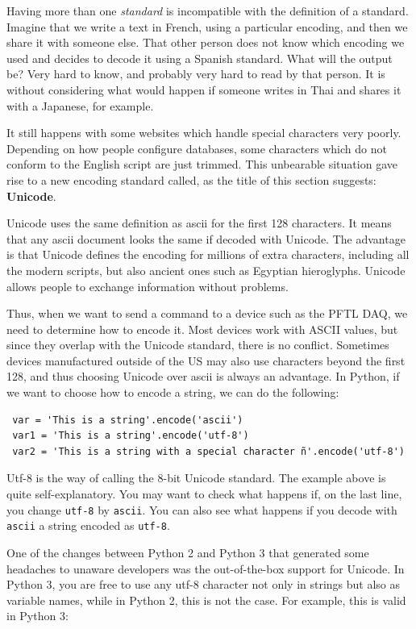 Having more than one \textit{standard} is incompatible with the definition of a standard. Imagine that we write a text in French, using a particular encoding, and then we share it with someone else. That other person does not know which encoding we used and decides to decode it using a Spanish standard. What will the output be? Very hard to know, and probably very hard to read by that person. It is without considering what would happen if someone writes in Thai and shares it with a Japanese, for example.

It still happens with some websites which handle special characters very poorly. Depending on how people configure databases, some characters which do not conform to the English script are just trimmed. This unbearable situation gave rise to a new encoding standard called, as the title of this section suggests: \textbf{Unicode}.

Unicode uses the same definition as ascii for the first 128 characters. It means that any ascii document looks the same if decoded with Unicode. The advantage is that Unicode defines the encoding for millions of extra characters, including all the modern scripts, but also ancient ones such as Egyptian hieroglyphs. Unicode allows people to exchange information without problems.

Thus, when we want to send a command to a device such as the {PFTL DAQ}, we need to determine how to encode it. Most devices work with ASCII values, but since they overlap with the Unicode standard, there is no conflict. Sometimes devices manufactured outside of the US may also use characters beyond the first 128, and thus choosing Unicode over ascii is always an advantage. In Python, if we want to choose how to encode a string, we can do the following:

\begin{verbatim}
 var = 'This is a string'.encode('ascii')
 var1 = 'This is a string'.encode('utf-8')
 var2 = 'This is a string with a special character ñ'.encode('utf-8')
\end{verbatim}

Utf-8 is the way of calling the 8-bit Unicode standard. The example above is quite self-explanatory. You may want to check what happens if, on the last line, you change \texttt{utf-8} by \texttt{ascii}. You can also see what happens if you decode with \texttt{ascii} a string encoded as \texttt{utf-8}.

One of the changes between Python 2 and Python 3 that generated some headaches to unaware developers was the out-of-the-box support for Unicode. In Python 3, you are free to use any utf-8 character not only in strings but also as variable names, while in Python 2, this is not the case. For example, this is valid in Python 3:

